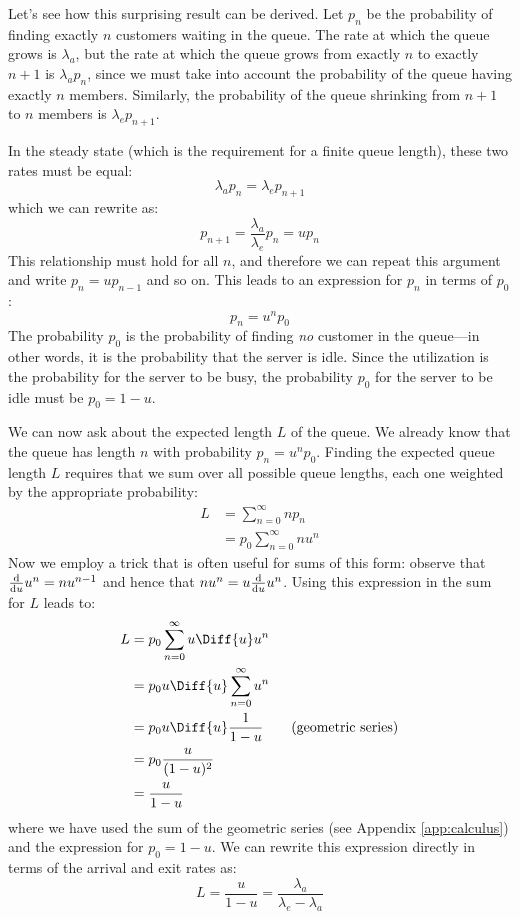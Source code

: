 Let's see how this surprising result can be derived. Let $p_n$ be the
probability of finding exactly $n$ customers waiting in the queue.
The rate at which the queue grows is $\lambda_a$, but the rate at
which the queue grows from exactly $n$ to exactly $n+1$ is $\lambda_a
p_n$, since we must take into account the probability of the queue
having exactly $n$ members. Similarly, the probability of the queue
shrinking from $n+1$ to $n$ members is $\lambda_e p_{n+1}$.

In the steady state (which is the requirement for a finite queue
length), these two rates must be equal:
%
\[
\lambda_a p_n = \lambda_e p_{n+1}
\]
%
which we can rewrite as:
%
\[
p_{n+1} = \frac{\lambda_a}{\lambda_e} p_n = u p_n
\]
%
This relationship must hold for all $n$, and therefore we can repeat
this argument and write $p_n = u p_{n-1}$ and so on. This leads to an
expression for $p_n$ in terms of $p_0$:
%
\[
p_n = u^n p_0
\]
%
The probability $p_0$ is the probability of finding \emph{no} customer
in the queue---in other words, it is the probability that the server
is idle. Since the utilization is the probability for the server to be
busy, the probability $p_0$ for the server to be idle must be $p_0 =
1-u$.

We can now ask about the expected length $L$ of the queue. We already
know that the queue has length $n$ with probability $p_n = u^n p_0$.
Finding\vadjust{\pagebreak} the expected queue length $L$ requires that we sum over all
possible queue lengths, each one weighted by the appropriate
probability:\vspace*{-2pt}
%
\begin{align*}
L & = \sum_{n=0}^\infty n p_n \\
  & = p_0 \sum_{n=0}^\infty n u^n
\end{align*}
Now we employ a trick that is often useful for sums of this form: 
observe that $\frac{\rm d}{{\rm d}u} u^n = n u^{n-1}$ and
hence that $n u^n = u
\frac{\rm d}{{\rm d}u} u^n$. Using this expression in the sum for $L$ leads
to:\vspace*{-2pt}
%
\begin{align*}
L & = p_0 \sum_{n=0}^\infty u \Diff{u} u^n \\
  & = p_0 u \Diff{u} \sum_{n=0}^\infty u^n \\
  & = p_0 u \Diff{u} \frac{1}{1-u} \qquad \text{(geometric series)} \\
  & = p_0 \frac{u}{(1-u)^2} \\
  & = \frac{u}{1-u}
\end{align*}
%
where we have used the sum of the geometric series (see Appendix
\ref{app:calculus}) and the expression for $p_0 = 1-u$. We can rewrite
this expression directly in terms of the arrival and exit rates
as:\vspace*{-2pt}
%
\[ 
L = \frac{u}{1-u} = \frac{\lambda_a}{\lambda_e - \lambda_a}
\]
%

